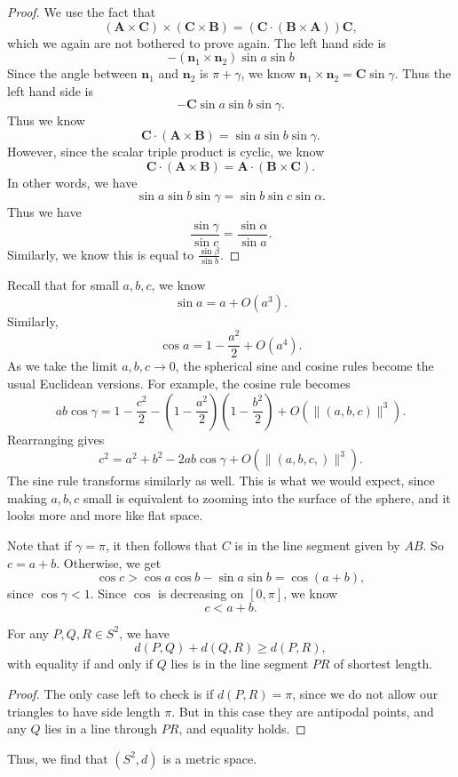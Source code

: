 \documentclass[a4paper]{article}
\begin{document}
\begin{proof}
  We use the fact that
  \[
    (\mathbf{A}\times \mathbf{C}) \times (\mathbf{C}\times \mathbf{B}) = (\mathbf{C}\cdot (\mathbf{B}\times \mathbf{A}))\mathbf{C},
  \]
  which we again are not bothered to prove again. The left hand side is
  \[
    -(\mathbf{n}_1 \times \mathbf{n}_2) \sin a \sin b
  \]
  Since the angle between $\mathbf{n}_1$ and $\mathbf{n}_2$ is $\pi + \gamma$, we know $\mathbf{n}_1 \times \mathbf{n}_2 = \mathbf{C}\sin \gamma$. Thus the left hand side is
  \[
    -\mathbf{C} \sin a \sin b \sin \gamma.
  \]
  Thus we know
  \[
    \mathbf{C}\cdot (\mathbf{A} \times \mathbf{B}) = \sin a\sin b \sin \gamma.
  \]
  However, since the scalar triple product is cyclic, we know
  \[
    \mathbf{C}\cdot (\mathbf{A}\times \mathbf{B}) = \mathbf{A}\cdot (\mathbf{B} \times \mathbf{C}).
  \]
  In other words, we have
  \[
    \sin a \sin b \sin \gamma = \sin b \sin c \sin \alpha.
  \]
  Thus we have
  \[
    \frac{\sin \gamma}{\sin c} = \frac{\sin \alpha}{\sin a}.
  \]
  Similarly, we know this is equal to $\frac{\sin \beta}{\sin b}$.
\end{proof}

Recall that for small $a, b, c$, we know
\[
  \sin a = a + O(a^3).
\]
Similarly,
\[
  \cos a = 1 - \frac{a^2}{2} + O(a^4).
\]
As we take the limit $a, b, c \to 0$, the spherical sine and cosine rules become the usual Euclidean versions. For example, the cosine rule becomes
\[
  ab \cos \gamma = 1 - \frac{c^2}{2} - \left(1 - \frac{a^2}{2}\right)\left(1 - \frac{b^2}{2}\right) + O(\|(a, b, c)\|^3).
\]
Rearranging gives
\[
  c^2 = a^2 + b^2 - 2ab \cos \gamma + O(\|(a, b, c,)\|^3).
\]
The sine rule transforms similarly as well. This is what we would expect, since making $a, b, c$ small is equivalent to zooming into the surface of the sphere, and it looks more and more like flat space.

Note that if $\gamma = \pi$, it then follows that $C$ is in the line segment given by $AB$. So $c = a + b$. Otherwise, we get
\[
  \cos c > \cos a \cos b - \sin a \sin b = \cos(a + b),
\]
since $\cos \gamma < 1$. Since $\cos$ is decreasing on $[0, \pi]$, we know
\[
  c < a + b.
\]
\begin{cor}
  For any $P, Q, R \in S^2$, we have
  \[
    d(P, Q) + d(Q, R) \geq d(P, R),
  \]
  with equality if and only if $Q$ lies is in the line segment $PR$ of shortest length.
\end{cor}

\begin{proof}
  The only case left to check is if $d(P, R) = \pi$, since we do not allow our triangles to have side length $\pi$. But in this case they are antipodal points, and any $Q$ lies in a line through $PR$, and equality holds.
\end{proof}
Thus, we find that $(S^2, d)$ is a metric space.
\end{document}
